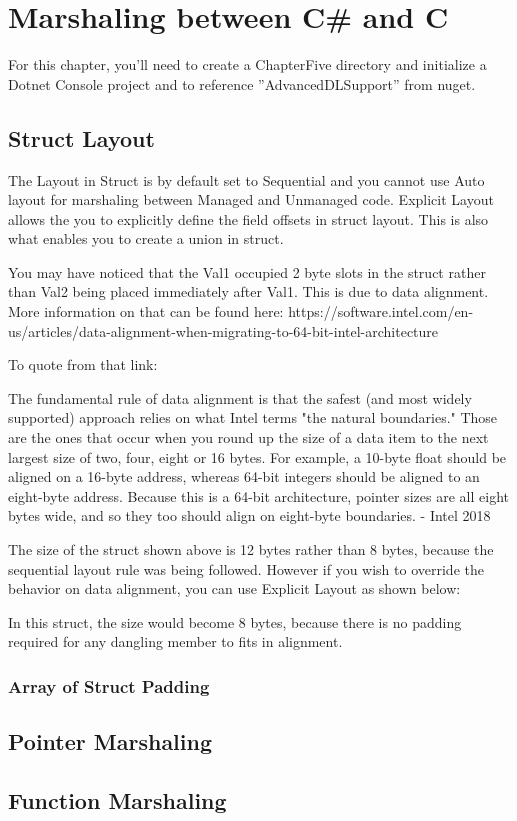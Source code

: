 \chapter{Marshaling between C\# and C}
For this chapter, you'll need to create a ChapterFive directory and initialize a Dotnet Console project and to reference ''AdvancedDLSupport'' from nuget.

\section{Struct Layout}
The Layout in Struct is by default set to Sequential and you cannot use Auto layout for marshaling between Managed and Unmanaged code. Explicit Layout allows the you to explicitly define the field offsets in struct layout. This is also what enables you to  create a union in struct.



You may have noticed that the Val1 occupied 2 byte slots in the struct rather than Val2 being placed immediately after Val1. This is due to data alignment.  More information on that can be found here: https://software.intel.com/en-us/articles/data-alignment-when-migrating-to-64-bit-intel-architecture

To quote from that link:

\begin{coloredbox}
	The fundamental rule of data alignment is that the safest (and most widely supported) approach relies on what Intel terms "the natural boundaries." Those are the ones that occur when you round up the size of a data item to the next largest size of two, four, eight or 16 bytes. For example, a 10-byte float should be aligned on a 16-byte address, whereas 64-bit integers should be aligned to an eight-byte address. Because this is a 64-bit architecture, pointer sizes are all eight bytes wide, and so they too should align on eight-byte boundaries. - Intel 2018
\end{coloredbox}

The size of the struct shown above is 12 bytes rather than 8 bytes, because the sequential layout rule was being followed. However if you wish to override the behavior on data alignment, you can use Explicit Layout as shown below:
\newpage


In this struct, the size would become 8 bytes, because there is no padding required for any dangling member to fits in alignment.

\subsection{Array of Struct Padding}
\section{Pointer Marshaling}

\section{Function Marshaling}

